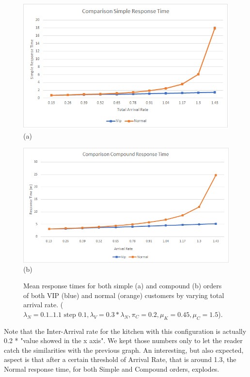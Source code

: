 \begin{figure}[H]
  \begin{minipage}{0.48\textwidth}
    \centering
    \includegraphics[width=\textwidth]{figs/workloadSimple.png}
    (a)
  \end{minipage}\hspace{0.03\textwidth}
  \begin{minipage}{0.48\textwidth}
    \centering
    \includegraphics[width=\textwidth]{figs/workloadCompound.png}
    (b)
  \end{minipage}
  \caption{Mean response times for both simple (a) and compound (b) orders of both VIP (blue) and normal (orange) customers by varying total arrival rate. ($\lambda_N={{0.1..1.1 \text{ step } 0.1}},\lambda_V=0.3*\lambda_N,\pi_C=0.2, \mu_K=0.45, \mu_C=1.5$).}
  \label{}
\end{figure}

Note that the Inter-Arrival rate for the kitchen with this configuration is actually 0.2 * "value showed in the x axis". We kept those numbers only to let the reader catch the similarities with the previous graph. An interesting, but also expected, aspect is that after a certain threshold of Arrival Rate, that is around 1.3, the Normal response time, for both Simple and Compound orders, explodes.

